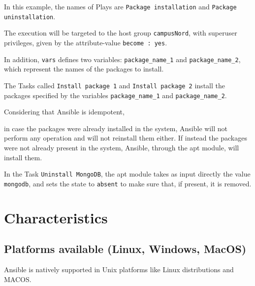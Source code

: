 \documentclass[12pt,a4paper,openright,twoside]{book}
\begin{document}


In this example, the names of Plays are \texttt{Package installation} and \texttt{Package uninstallation}.


The execution will be targeted to the host group \texttt{campusNord}, with superuser privileges, given by the attribute-value \texttt{become : yes}.


In addition, \texttt{vars} defines two variables: \texttt{package\_name\_1} and \texttt{package\_name\_2}, which represent the names of the packages to install.


The Tasks called \texttt{Install package 1} and \texttt{Install package 2} install the packages specified by the variables \texttt{package\_name\_1} and \texttt{package\_name\_2}.


Considering that Ansible is idempotent,


in case the packages were already installed in the system, Ansible will not perform any operation and will not reinstall them either. If instead the packages were not already present in the system, Ansible, through the apt module, will install them.


In the Task \texttt{Uninstall MongoDB}, the apt module takes as input directly the value \texttt{mongodb}, and sets the state to \texttt{absent} to make sure that, if present, it is removed.




\section{Characteristics}

\subsection{Platforms available (Linux, Windows, MacOS)}
Ansible is natively supported in Unix platforms like Linux distributions and MACOS.
\end{document}
